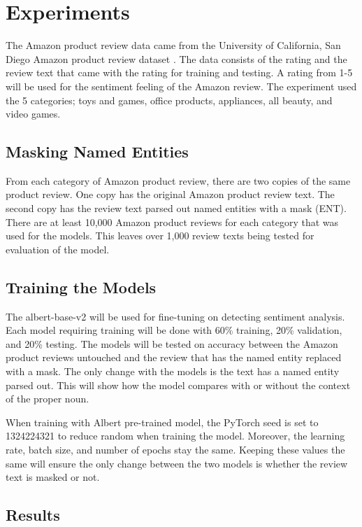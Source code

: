 \documentclass[11pt,a4paper]{article}
\begin{document}
\section{Experiments}

The Amazon product review data came from the University of California, San Diego Amazon product review dataset \cite{data}. The data consists of the rating and the review text that came with the rating for training and testing. A rating from 1-5 will be used for the sentiment feeling of the Amazon review. The experiment used the 5 categories; toys and games, office products, appliances, all beauty, and video games.

\subsection{Masking Named Entities}

From each category of Amazon product review, there are two copies of the same product review. One copy has the original Amazon product review text. The second copy has the review text parsed out named entities with a mask (ENT). There are at least 10,000 Amazon product reviews for each category that was used for the models. This leaves over 1,000 review texts being tested for evaluation of the model.

\subsection{Training the Models}

The albert-base-v2 will be used for fine-tuning on detecting sentiment analysis. Each model requiring training will be done with 60\% training, 20\% validation, and 20\% testing. The models will be tested on accuracy between the Amazon product reviews untouched and the review that has the named entity replaced with a mask. The only change with the models is the text has a named entity parsed out. This will show how the model compares with or without the context of the proper noun.

When training with Albert pre-trained model, the PyTorch seed is set to 1324224321 to reduce random when training the model. Moreover, the learning rate, batch size, and number of epochs stay the same. Keeping these values the same will ensure the only change between the two models is whether the review text is masked or not.

\subsection{Results}
\end{document}
